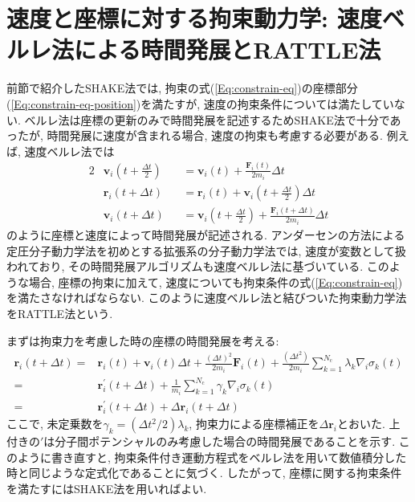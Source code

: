 \section{速度と座標に対する拘束動力学: 速度ベルレ法による時間発展とRATTLE法}
前節で紹介したSHAKE法では, 拘束の式(\ref{Eq:constrain-eq})の座標部分(\ref{Eq:constrain-eq-position})を満たすが, 速度の拘束条件については満たしていない. 
ベルレ法は座標の更新のみで時間発展を記述するためSHAKE法で十分であったが, 時間発展に速度が含まれる場合, 速度の拘束も考慮する必要がある. 
例えば, 速度ベルレ法では
\begin{alignat}{2}
    &\bm{v}_{i} \left( t + \frac{\Delta t}{2} \right)
    &&= \bm{v}_{i} (t)
     + \frac{\bm{F}_{i} (t) }{2m_{i}} \Delta t
    \label{Eq:vel-verlet-vhalf}
    \\
    &\bm{r}_{i} (t + \Delta t)
    &&= \bm{r}_{i} (t)
      + \bm{v}_{i} \left( t + \frac{\Delta t}{2} \right)\Delta t
    \label{Eq:vel-verlet-r}
    \\
    &\bm{v}_{i} \left( t + \Delta t \right)
    &&= \bm{v}_{i} \left(t + \frac{\Delta t}{2} \right)
     + \frac{\bm{F}_{i} (t + \Delta t) }{2m_{i}} \Delta t
    \label{Eq:vel-verlet-v}
\end{alignat}
のように座標と速度によって時間発展が記述される. 
アンダーセンの方法による定圧分子動力学法\cite{1980Andersen}を初めとする拡張系の分子動力学法では, 速度が変数として扱われており, その時間発展アルゴリズムも速度ベルレ法に基づいている. 
このような場合, 座標の拘束に加えて, 速度についても拘束条件の式(\ref{Eq:constrain-eq})を満たさなければならない. 
このように速度ベルレ法と結びついた拘束動力学法をRATTLE法\cite{1983Andersen}という. 

まずは拘束力を考慮した時の座標の時間発展を考える:
\begin{align}
    \bm{r}_{i} (t + \Delta t)
    =&
    \bm{r}_{i} (t)
    +
    \bm{v}_{i} (t) \Delta t + \frac{(\Delta t)^{2}}{2m_{i}} \bm{F}_{i}(t)
    +
    \frac{(\Delta t^{2})}{2m_{i}}
    \sum_{k=1}^{N_{\mathrm{c}}} \lambda_{k} \nabla_{i} \sigma_{k}(t)
    \\
    =&
    \bm{r}_{i}^{\prime} (t + \Delta t)
    +
    \frac{1}{m_{i}} \sum_{k=1}^{N_{\mathrm{c}}} \gamma_{k} \nabla_{i} \sigma_{k}(t)
    \\
    =&
    \bm{r}_{i}^{\prime} (t + \Delta t)
    +
    \Delta \bm{r}_{i} (t + \Delta t)
\end{align}
ここで, 未定乗数を$\gamma_{k} = (\Delta t^{2}/2)\lambda_{k}$, 拘束力による座標補正を$\Delta \bm{r}_{i}$とおいた. 
上付きの$\prime$は分子間ポテンシャルのみ考慮した場合の時間発展であることを示す. 
このように書き直すと, 拘束条件付き運動方程式をベルレ法を用いて数値積分した時と同じような定式化であることに気づく. 
したがって, 座標に関する拘束条件を満たすにはSHAKE法を用いればよい. 

